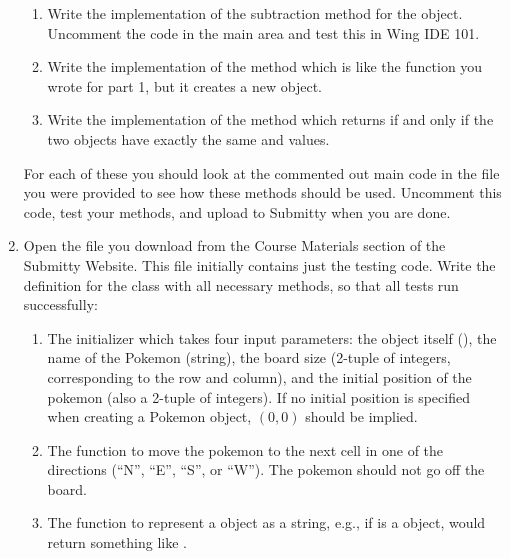 \documentclass[letterpaper,10pt,english]{sphinxmanual}
\begin{document}
\begin{enumerate}
\begin{enumerate}
\item {} 
Write the implementation of the subtraction method 
for the  object. Uncomment the code in the main area
and test this in Wing IDE 101.

\item {} 
Write the implementation of the method  which is
like the  function you wrote for part 1, but it creates
a new  object.

\item {} 
Write the implementation of the method  which
returns  if and only if the two  objects have
exactly the same  and  values.

\end{enumerate}

For each of these you should look at the commented out main code in
the  file you were provided to see how these
methods should be used. Uncomment this code, test your methods,
and upload to Submitty when you are done.

\item {} 
Open the file  you download from the
Course Materials section of the Submitty Website. This file initially
contains just the testing code. Write the definition for the 
class with all necessary methods, so that all tests run successfully:
\begin{enumerate}
\def\theenumii{\arabic{enumii}}
\def\labelenumii{\theenumii .}
\makeatletter\def\p@enumiii{\p@enumii \theenumii .}\makeatother
\item {} 
The initializer which takes four input parameters:
the object itself (), the name of the Pokemon (string),
the board size (2-tuple of integers, corresponding to the row and
column), and the initial position of the pokemon (also a 2-tuple
of integers). If no initial position is specified
when creating a Pokemon object, \((0, 0)\) should be implied.

\item {} 
The function to move the pokemon to the next cell in one of the
directions (“N”, “E”, “S”, or “W”). The pokemon should not go off
the board.

\item {} 
The function to represent a  object as a string, e.g.,
if  is a  object,  would
return something like .

\end{enumerate}

\end{enumerate}
\end{document}
